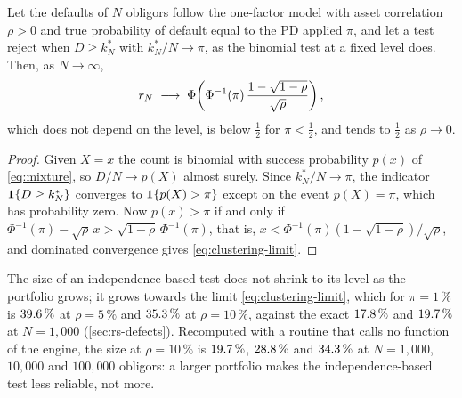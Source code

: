 \begin{proposition}
\label{prop:clustering}
Let the defaults of $N$ obligors follow the one-factor model with asset correlation $\rho>0$ and true probability of default equal to the PD applied $\pi$, and let a test reject when $D\ge k^*_N$ with $k^*_N/N\to\pi$, as the binomial test at a fixed level does. Then, as $N\to\infty$,
\begin{equation}
r_N\;\longrightarrow\;\Phi\!\left(\Phi^{-1}(\pi)\,\frac{1-\sqrt{1-\rho}}{\sqrt\rho}\right),
\label{eq:clustering-limit}
\end{equation}
which does not depend on the level, is below $\tfrac12$ for $\pi<\tfrac12$, and tends to $\tfrac12$ as $\rho\to0$.
\end{proposition}
\begin{proof}
Given $X=x$ the count is binomial with success probability $p(x)$ of \eqref{eq:mixture}, so $D/N\to p(X)$ almost surely. Since $k^*_N/N\to\pi$, the indicator $\mathbf{1}\{D\ge k^*_N\}$ converges to $\mathbf{1}\{p(X)>\pi\}$ except on the event $p(X)=\pi$, which has probability zero. Now $p(x)>\pi$ if and only if $\Phi^{-1}(\pi)-\sqrt\rho\,x>\sqrt{1-\rho}\,\Phi^{-1}(\pi)$, that is, $x<\Phi^{-1}(\pi)(1-\sqrt{1-\rho})/\sqrt\rho$, and dominated convergence gives \eqref{eq:clustering-limit}.
\end{proof}

The size of an independence-based test does not shrink to its level as the portfolio grows; it grows towards the limit \eqref{eq:clustering-limit}, which for $\pi=1\,\%$ is $39.6\,\%$ at $\rho=5\,\%$ and $35.3\,\%$ at $\rho=10\,\%$, against the exact $17.8\,\%$ and $19.7\,\%$ at $N=1{,}000$ (\cref{sec:rs-defects}).
Recomputed with a routine that calls no function of the engine, the size at $\rho=10\,\%$ is $19.7\,\%$, $28.8\,\%$ and $34.3\,\%$ at $N=1{,}000$, $10{,}000$ and $100{,}000$ obligors: a larger portfolio makes the independence-based test less reliable, not more.


